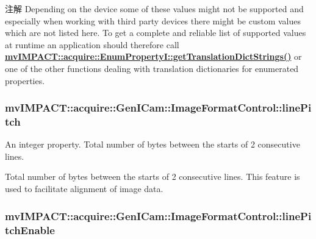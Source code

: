 \begin{DoxyNote}{注解}
Depending on the device some of these values might not be supported and especially when working with third party devices there might be custom values which are not listed here. To get a complete and reliable list of supported values at runtime an application should therefore call {\bfseries \hyperlink{classmv_i_m_p_a_c_t_1_1acquire_1_1_enum_property_i_a0ba6ccbf5ee69784d5d0b537924d26b6}{mv\+I\+M\+P\+A\+C\+T\+::acquire\+::\+Enum\+Property\+I\+::get\+Translation\+Dict\+Strings()}} or one of the other functions dealing with translation dictionaries for enumerated properties. 
\end{DoxyNote}
\hypertarget{classmv_i_m_p_a_c_t_1_1acquire_1_1_gen_i_cam_1_1_image_format_control_a709a0ec40bef18f6a7a57d17b7a1fb72}{
\subsubsection[{line\+Pitch}]{ mv\+I\+M\+P\+A\+C\+T\+::acquire\+::\+Gen\+I\+Cam\+::\+Image\+Format\+Control\+::line\+Pitch}}\label{classmv_i_m_p_a_c_t_1_1acquire_1_1_gen_i_cam_1_1_image_format_control_a709a0ec40bef18f6a7a57d17b7a1fb72}


An integer property. Total number of bytes between the starts of 2 consecutive lines. 

Total number of bytes between the starts of 2 consecutive lines. This feature is used to facilitate alignment of image data. \hypertarget{classmv_i_m_p_a_c_t_1_1acquire_1_1_gen_i_cam_1_1_image_format_control_a96cf918c428ca52a9c1f7f8b481ab2bf}{
\subsubsection[{line\+Pitch\+Enable}]{ mv\+I\+M\+P\+A\+C\+T\+::acquire\+::\+Gen\+I\+Cam\+::\+Image\+Format\+Control\+::line\+Pitch\+Enable}}\label{classmv_i_m_p_a_c_t_1_1acquire_1_1_gen_i_cam_1_1_image_format_control_a96cf918c428ca52a9c1f7f8b481ab2bf}


